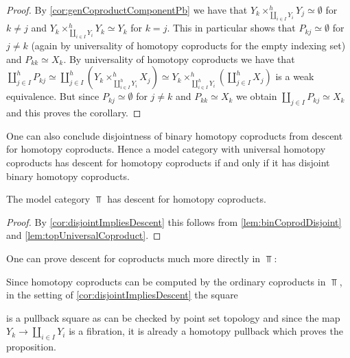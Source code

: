 \begin{corollary}
\begin{proof}
        By \cref{cor:genCoproductComponentPb} we have that $Y_k\times_{\coprod\limits_{i\in I}Y_i}^h Y_j\simeq\emptyset$ for $k\neq j$ and $Y_k\times_{\coprod\limits_{i\in I}Y_i}^h Y_k\simeq Y_k$ for $k=j$.
        This in particular shows that $P_{kj}\simeq\emptyset$ for $j\neq k$ (again by universality of homotopy coproducts for the empty indexing set) and $P_{kk}\simeq X_k$.
        By universality of homotopy coproducts we have that $\coprod\limits_{j\in I}^hP_{kj}\simeq\coprod\limits_{j\in I}^h\left(Y_k\times_{\coprod\limits_{i\in I}^hY_i}^hX_j\right)\simeq Y_k\times_{\coprod\limits_{i\in I}^hY_i}^h\left(\coprod\limits_{j\in I}^hX_j\right)$ is a weak equivalence.
        But since $P_{kj}\simeq\emptyset$ for $j\neq k$ and $P_{kk}\simeq X_k$ we obtain $\coprod\limits_{j\in I}P_{kj}\simeq X_k$ and this proves the corollary.
    \end{proof}
\end{corollary}
\begin{remark}
    One can also conclude disjointness of binary homotopy coproducts from descent for homotopy coproducts.
    Hence a model category with universal homotopy coproducts has descent for homotopy coproducts if and only if it has disjoint binary homotopy coproducts.
\end{remark}
\begin{corollary}\label{cor:topDescentCoproduct}
    The model category $\Top$ has descent for homotopy coproducts.
    \begin{proof}
        By \cref{cor:disjointImpliesDescent} this follows from \cref{lem:binCoprodDisjoint} and \cref{lem:topUniversalCoproduct}.
    \end{proof}
\end{corollary}
\begin{remark}
    One can prove descent for coproducts much more directly in $\Top$:
    
    Since homotopy coproducts can be computed by the ordinary coproducts in $\Top$, in the setting of \cref{cor:disjointImpliesDescent} the square
    \begin{center}
    \end{center}
    is a pullback square as can be checked by point set topology and since the map $Y_k\to\coprod\limits_{i\in I}Y_i$ is a fibration, it is already a homotopy pullback which proves the proposition.
\end{remark}

